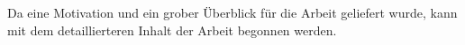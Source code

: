 Da eine Motivation und ein grober Überblick für die Arbeit geliefert wurde, kann mit dem detaillierteren Inhalt der Arbeit begonnen werden.

































